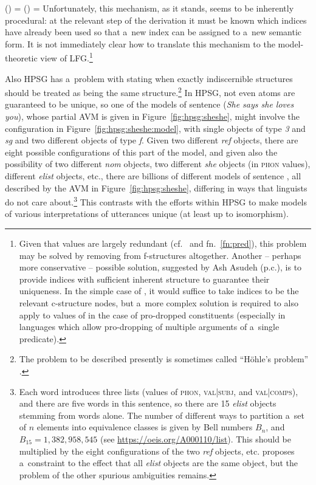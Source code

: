 \documentclass[output=paper,hidelinks]{langscibook}
\begin{document}
\ea 
\ea (\UP\PRED) = 
\ex (\UP\PRED) = 
\z\z
Unfortunately, this mechanism, as it stands, seems to be inherently procedural: at the relevant step of the derivation it must be known which indices have already been used so that a~new index can be assigned to a~new semantic form.  It is not immediately clear how to translate this mechanism to the model-theoretic view of LFG.\footnote{Given that \PRED values are largely redundant (cf.~ and fn.~\ref{fn:pred}), this problem may be solved by removing \PRED from f-structures altogether.  Another -- perhaps more conservative -- possible solution, suggested by Ash Asudeh (p.c.), is to provide indices with sufficient inherent structure to guarantee their uniqueness.  In the simple case of , it would suffice to take indices to be the relevant c-structure nodes, but a~more complex solution is required to also apply to  values of \PRED in the case of pro-dropped constituents (especially in languages which allow pro-dropping of multiple arguments of a~single predicate).}

Also HPSG has a~problem with stating when exactly indiscernible structures should be treated as being the same structure.\footnote{The problem to be described presently is sometimes called “Höhle's problem” \citep[113]{poll:01,poll:04}.}  In HPSG, not even atoms are guaranteed to be unique, so one of the models of sentence  (\emph{She says she loves you}), whose partial AVM is given in Figure~\ref{fig:hpsg:sheshe}, might involve the configuration in Figure~\ref{fig:hpsg:sheshe:model}, with single objects of type \textit{3} and \textit{sg} and two different objects of type \textit{f}. Given two different \textit{ref} objects, there are eight possible configurations of this part of the model, and given also the possibility of two different \textit{nom} objects, two different \textit{she} objects (in \textsc{phon} values), different \textit{elist} objects, etc., there are billions of different models of sentence , all described by the AVM in Figure~\ref{fig:hpsg:sheshe}, differing in ways that linguists do not care about.\footnote{Each word introduces three lists (values of \textsc{phon}, \textsc{val|subj}, and \textsc{val|comps}), and there are five words in this sentence, so there are 15 \textit{elist} objects stemming from words alone.  The number of different ways to partition a~set of $n$ elements into equivalence classes is given by Bell numbers $B_n$, and $B_{15} = 1{,}382{,}958{,}545$ (see \url{https://oeis.org/A000110/list}).  This should be multiplied by the eight configurations of the two \textit{ref} objects, etc.  \citet{rich:07:hpsg} proposes a~constraint to the effect that all \textit{elist} objects are the same object, but the problem of the other spurious ambiguities remains.}  This contrasts with the efforts within HPSG \citep{pollard1994head-driven,poll:98,rich:07:hpsg} to make models of various interpretations of utterances unique (at least up to isomorphism).
\end{document}
